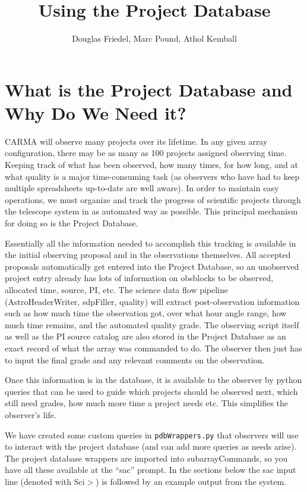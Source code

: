 \documentclass[preprint]{aastex} %
\begin{document}
\title{Using the Project Database}
\author{Douglas Friedel, Marc Pound, Athol Kemball}



\section{What is the Project Database and Why Do We Need it?}

CARMA will observe many projects over its lifetime.  In any given array
configuration, there may be as many as 100 projects assigned observing time.
Keeping track of what has been observed, how many times, for how long,
and at what quality is a major time-consuming task (as observers who have
had to keep multiple spreadsheets up-to-date are well aware).  In order
to maintain easy operations, we must organize and track the progress
of scientific projects through the telescope system in as automated way
as possible.  This principal mechanism for doing so is the Project Database.

Essentially all the information needed to accomplish this tracking
is available in the initial observing proposal and in the observations
themselves. All accepted proposals automatically get entered into the
Project Database, so an unobserved project entry already has lots
of information on obsblocks to be observed, allocated time, source, PI, etc. 
The science data flow pipeline (AstroHeaderWriter, sdpFiller, quality)
will extract post-observation information such as how much time the
observation got, over what hour angle range, how much time remains,
and the automated quality grade.  The observing script itself as well
as the PI source catalog are also
stored in the Project Database as an exact record of what the array was
commanded to do.  The observer then just has to input the final grade
and any relevant comments on the observation.

Once this information is in the database, it is available to the observer
by python queries that can be used to guide which projects should be
observed next, which still need grades, how much more time a project
needs etc.  This simplifies the observer's life.

We have created some custom queries in {\tt pdbWrappers.py} that observers
will use to interact with the project database (and can add more queries
as needs arise).  The project database wrappers are imported into
subarrayCommands, so you have all these available at the ``sac'' prompt.
In the sections below the sac input line (denoted with Sci$>$) is followed
by an example output from the system.
\end{document}
